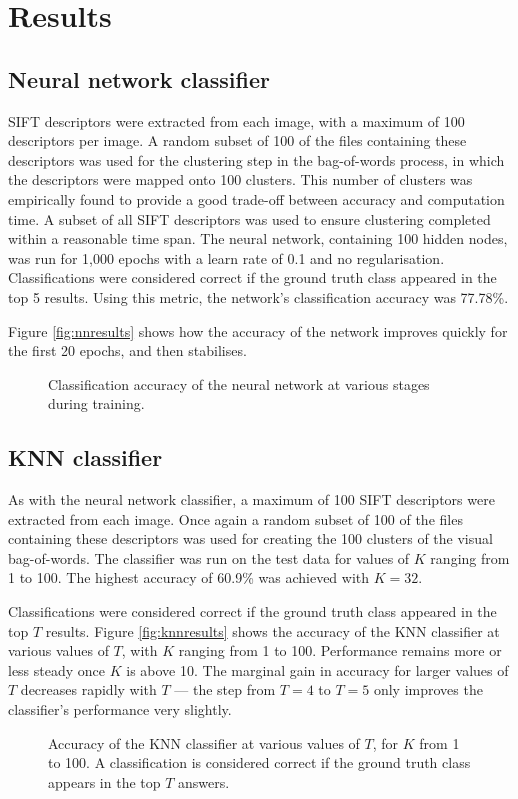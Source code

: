 \section{Results}

\subsection{Neural network classifier}
SIFT descriptors were extracted from each image, with a maximum of 100 descriptors per image.
A random subset of 100 of the files containing these descriptors was used for the clustering step in the bag-of-words process, in which the descriptors were mapped onto 100 clusters.
This number of clusters was empirically found to provide a good trade-off between accuracy and computation time.
A subset of all SIFT descriptors was used to ensure clustering completed within a reasonable time span.
The neural network, containing 100 hidden nodes, was run for 1,000 epochs with a learn rate of 0.1 and no regularisation.
Classifications were considered correct if the ground truth class appeared in the top 5 results.
Using this metric, the network's classification accuracy was 77.78\%.

Figure \vref{fig:nnresults} shows how the accuracy of the network improves quickly for the first 20 epochs, and then stabilises.

\begin{figure}[htb]
	\centering
	\caption{Classification accuracy of the neural network at various stages during training.}
	\label{fig:nnresults}
\end{figure}

\subsection{KNN classifier}
As with the neural network classifier, a maximum of 100 SIFT descriptors were extracted from each image.
Once again a random subset of 100 of the files containing these descriptors was used for creating the 100 clusters of the visual bag-of-words.
The classifier was run on the test data for values of $K$ ranging from 1 to 100.
The highest accuracy of 60.9\% was achieved with $K = 32$.

Classifications were considered correct if the ground truth class appeared in the top $T$ results.
Figure \vref{fig:knnresults} shows the accuracy of the KNN classifier at various values of $T$, with $K$ ranging from 1 to 100.
Performance remains more or less steady once $K$ is above 10.
The marginal gain in accuracy for larger values of $T$ decreases rapidly with $T$ --- the step from $T=4$ to $T=5$ only improves the classifier's performance very slightly.


\begin{figure}[htb]
	\centering
	\caption{Accuracy of the KNN classifier at various values of $T$, for $K$ from 1 to 100. A classification is considered correct if the ground truth class appears in the top $T$ answers.}
	\label{fig:knnresults}
\end{figure}
